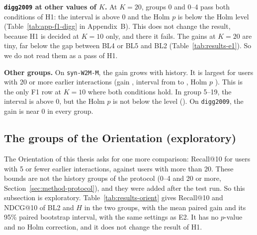 \textbf{\texttt{digg2009} at other values of $K$.} At $K = 20$, groups 0 and 0--4 pass both conditions of H1: the interval is above 0 and the Holm $p$ is below the Holm level (Table~\ref{tab:app-f1-digg} in Appendix~B). This does not change the result, because H1 is decided at $K = 10$ only, and there it fails. The gains at $K = 20$ are tiny, far below the gap between BL4 or BL5 and BL2 (Table~\ref{tab:results-e1}). So we do not read them as a pass of H1.

\textbf{Other groups.} On \texttt{syn-W2M-M}, the gain grows with history. It is largest for users with 20 or more earlier interactions (gain \eTwoWTwoMNdcgTenTwentyPlusGain{}, interval from \eTwoWTwoMNdcgTenTwentyPlusCiLow{} to \eTwoWTwoMNdcgTenTwentyPlusCiHigh{}, Holm $p$ \eTwoWTwoMNdcgTenTwentyPlusPHolm{}). This is the only F1 row at $K = 10$ where both conditions hold. In group 5--19, the interval is above 0, but the Holm $p$ is not below the level (\eTwoWTwoMNdcgTenFiveNineteenPHolm{}). On \texttt{digg2009}, the gain is near 0 in every group.

\subsection{The groups of the Orientation (exploratory)}
\label{sec:results-orient}

The Orientation of this thesis asks for one more comparison: Recall@10 for users with 5 or fewer earlier interactions, against users with more than 20. These bounds are not the history groups of the protocol (0--4 and 20 or more, Section~\ref{sec:method-protocol}), and they were added after the test run. So this subsection is exploratory. Table~\ref{tab:results-orient} gives Recall@10 and NDCG@10 of BL2 and $H$ in the two groups, with the mean paired gain and its 95\% paired bootstrap interval, with the same settings as E2. It has no $p$-value and no Holm correction, and it does not change the result of H1.

\begin{table}[htbp]
  \centering
  \caption{E2 with the groups of the Orientation (exploratory): $H$ against BL2 for users with 5 or fewer and with more than 20 earlier interactions, $K = 10$, paired bootstrap interval, no $p$-value.}
  \label{tab:results-orient}
  \small
  \resizebox{\textwidth}{!}{}
\end{table}


